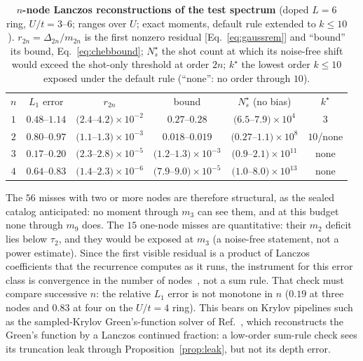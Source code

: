\documentclass[aps,prb,reprint,onecolumn,12pt,superscriptaddress,longbibliography,floatfix]{revtex4-2}
\begin{document}
\begin{table}[t]
\caption{\label{tab:krylov}\textbf{$n$-node Lanczos reconstructions of the test spectrum} (doped $L=6$ ring, $U/t=3$--$6$; ranges over $U$; exact moments, default rule extended to $k\le10$). $r_{2n}=\Delta_{2n}/m_{2n}$ is the first nonzero residual [Eq.~\eqref{eq:gaussrem}] and ``bound'' its bound, Eq.~\eqref{eq:chebbound}; $N_s^\star$ the shot count at which its noise-free shift would exceed the shot-only threshold at order $2n$; $k^\star$ the lowest order $k\le10$ exposed under the default rule (``none'': no order through $10$).}
\footnotesize
\begin{ruledtabular}
\begin{tabular}{cccccc}
$n$ & $L_1$ error & $r_{2n}$ & bound & $N_s^\star$ (no bias) & $k^\star$ \\
\colrule
$1$ & $0.48$--$1.14$ & $(2.4$--$4.2)\times10^{-2}$ & $0.27$--$0.28$ & $(6.5$--$7.9)\times10^4$ & $3$ \\
$2$ & $0.80$--$0.97$ & $(1.1$--$1.3)\times10^{-3}$ & $0.018$--$0.019$ & $(0.27$--$1.1)\times10^8$ & $10$/none \\
$3$ & $0.17$--$0.20$ & $(2.3$--$2.8)\times10^{-5}$ & $(1.2$--$1.3)\times10^{-3}$ & $(0.9$--$2.1)\times10^{11}$ & none \\
$4$ & $0.64$--$0.83$ & $(1.4$--$2.3)\times10^{-6}$ & $(7.9$--$9.0)\times10^{-5}$ & $(1.0$--$8.0)\times10^{13}$ & none \\
\end{tabular}
\end{ruledtabular}
\end{table}

The $56$ misses with two or more nodes are therefore structural, as the sealed catalog anticipated: no moment through $m_3$ can see them, and at this budget none through $m_9$ does. The $15$ one-node misses are quantitative: their $m_2$ deficit lies below $\tau_2$, and they would be exposed at $m_3$ (a noise-free statement, not a power estimate). Since the first visible residual is a product of Lanczos coefficients that the recurrence computes as it runs, the instrument for this error class is convergence in the number of nodes~\cite{Epperly2022,Kirby2024}, not a sum rule. That check must compare successive $n$: the relative $L_1$ error is not monotone in $n$ ($0.19$ at three nodes and $0.83$ at four on the $U/t=4$ ring). This bears on Krylov pipelines such as the sampled-Krylov Green's-function solver of Ref.~\cite{Patel2026}, which reconstructs the Green's function by a Lanczos continued fraction: a low-order sum-rule check sees its truncation leak through Proposition~\ref{prop:leak}, but not its depth error.
\end{document}
